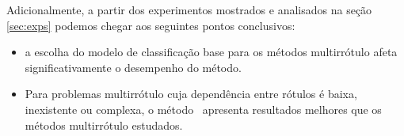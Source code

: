 Adicionalmente, a partir dos experimentos mostrados e analisados na seção \ref{sec:exps} podemos
chegar aos seguintes pontos conclusivos:
  \begin{itemize}
   \item a escolha do modelo de classificação base para os métodos multirrótulo
   afeta significativamente o desempenho do método.
   \item Para problemas multirrótulo cuja dependência entre rótulos é baixa, inexistente ou complexa, o
   método \BR~apresenta resultados melhores que os métodos multirrótulo estudados.
  \end{itemize}


  
\label{sec:conclusions}
